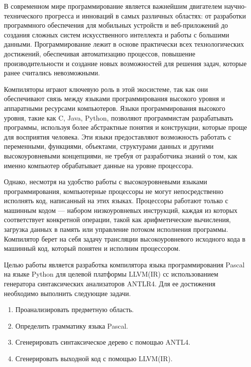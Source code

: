 \maketableofcontents

\intro

В современном мире программирование является важнейшим двигателем научно-технического прогресса и инноваций в самых различных областях: от разработки программного обеспечения для мобильных устройств и веб-приложений до создания сложных систем искусственного интеллекта и работы с большими данными. Программирование лежит в основе практически всех технологических достижений, обеспечивая автоматизацию процессов, повышение производительности и создание новых возможностей для решения задач, которые ранее считались невозможными.

Компиляторы играют ключевую роль в этой экосистеме, так как они обеспечивают связь между языками программирования высокого уровня и аппаратными ресурсами компьютеров. Языки программирования высокого уровня, такие как C, Java, Python, позволяют программистам разрабатывать программы, используя более абстрактные понятия и конструкции, которые проще для восприятия человека. Эти языки предоставляют возможность работать с переменными, функциями, объектами, структурами данных и другими высокоуровневыми концепциями, не требуя от разработчика знаний о том, как именно компьютер обрабатывает данные на уровне процессора.

Однако, несмотря на удобство работы с высокоуровневыми языками программирования, компьютерные процессоры не могут непосредственно исполнять код, написанный на этих языках. Процессоры работают только с машинным кодом — набором низкоуровневых инструкций, каждая из которых соответствует конкретной операции, такой как арифметические вычисления, загрузка данных в память или управление потоком исполнения программы. Компилятор берет на себя задачу трансляции высокоуровневого исходного кода в машинный код, который понятен и исполним процессором.

Целью работы является разработка компилятора языка программирования Pascal на языке Python для целевой платформы LLVM(IR) сс использованием генератора синтаксических анализаторов ANTLR4. Для ее достижения необходимо выполнить следующие задачи.

\begin{enumerate}
  \item Проанализировать предметную область.
  \item Определить грамматику языка Pascal.
  \item Сгенерировать синтаксическое дерево с помощью ANTL4.
  \item Сгенерировать выходной код с помощью LLVM(IR).
\end{enumerate}
